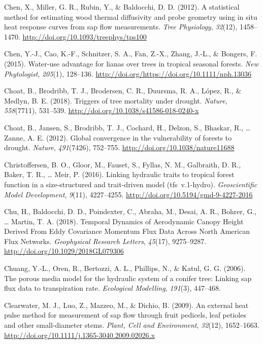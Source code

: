 \documentclass[11pt,twoside]{reedthesis}
\begin{document}
\hypertarget{ref-Chen2012}{}
Chen, X., Miller, G. R., Rubin, Y., \& Baldocchi, D. D. (2012). A
statistical method for estimating wood thermal diffusivity and probe
geometry using in situ heat response curves from sap flow measurements.
\emph{Tree Physiology}, \emph{32}(12), 1458--1470.
\url{http://doi.org/10.1093/treephys/tps100}

\hypertarget{ref-Chen2015}{}
Chen, Y.-J., Cao, K.-F., Schnitzer, S. A., Fan, Z.-X., Zhang, J.-L., \&
Bongers, F. (2015). Water-use advantage for lianas over trees in
tropical seasonal forests. \emph{New Phytologist}, \emph{205}(1),
128--136. \url{http://doi.org/https://doi.org/10.1111/nph.13036}

\hypertarget{ref-choat_triggers_2018}{}
Choat, B., Brodribb, T. J., Brodersen, C. R., Duursma, R. A., López, R.,
\& Medlyn, B. E. (2018). Triggers of tree mortality under drought.
\emph{Nature}, \emph{558}(7711), 531--539.
\url{http://doi.org/10.1038/s41586-018-0240-x}

\hypertarget{ref-choat_global_2012}{}
Choat, B., Jansen, S., Brodribb, T. J., Cochard, H., Delzon, S.,
Bhaskar, R., \ldots{} Zanne, A. E. (2012). Global convergence in the
vulnerability of forests to drought. \emph{Nature}, \emph{491}(7426),
752--755. \url{http://doi.org/10.1038/nature11688}

\hypertarget{ref-Christoffersen2016}{}
Christoffersen, B. O., Gloor, M., Fauset, S., Fyllas, N. M., Galbraith,
D. R., Baker, T. R., \ldots{} Meir, P. (2016). Linking hydraulic traits
to tropical forest function in a size-structured and trait-driven model
(tfs~v.1-hydro). \emph{Geoscientific Model Development}, \emph{9}(11),
4227--4255. \url{http://doi.org/10.5194/gmd-9-4227-2016}

\hypertarget{ref-chu_temporal_2018}{}
Chu, H., Baldocchi, D. D., Poindexter, C., Abraha, M., Desai, A. R.,
Bohrer, G., \ldots{} Martin, T. A. (2018). Temporal Dynamics of
Aerodynamic Canopy Height Derived From Eddy Covariance Momentum Flux
Data Across North American Flux Networks. \emph{Geophysical Research
Letters}, \emph{45}(17), 9275--9287.
\url{http://doi.org/10.1029/2018GL079306}

\hypertarget{ref-Chuang2006}{}
Chuang, Y.-L., Oren, R., Bertozzi, A. L., Phillips, N., \& Katul, G. G.
(2006). The porous media model for the hydraulic system of a conifer
tree: Linking sap flux data to transpiration rate. \emph{Ecological
Modelling}, \emph{191}(3), 447--468.

\hypertarget{ref-Clearwater2009}{}
Clearwater, M. J., Luo, Z., Mazzeo, M., \& Dichio, B. (2009). An
external heat pulse method for measurement of sap flow through fruit
pedicels, leaf petioles and other small-diameter stems. \emph{Plant,
Cell and Environment}, \emph{32}(12), 1652--1663.
\url{http://doi.org/10.1111/j.1365-3040.2009.02026.x}
\end{document}
